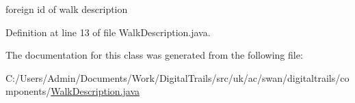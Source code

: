 foreign id of walk description 



Definition at line 13 of file Walk\+Description.\+java.



The documentation for this class was generated from the following file\+:\begin{DoxyCompactItemize}
\item 
C\+:/\+Users/\+Admin/\+Documents/\+Work/\+Digital\+Trails/src/uk/ac/swan/digitaltrails/components/\hyperlink{_walk_description_8java}{Walk\+Description.\+java}\end{DoxyCompactItemize}
